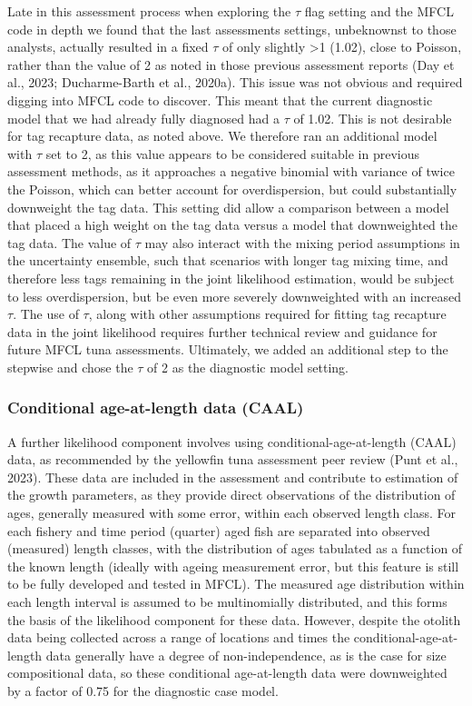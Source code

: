\documentclass[
  english,
  a4paper,
  a4paper,
  11pt]{SCreport}
\begin{document}
Late in this assessment process when exploring the \(\tau\) flag setting
and the MFCL code in depth we found that the last assessments settings,
unbeknownst to those analysts, actually resulted in a fixed \(\tau\) of
only slightly \textgreater1 (1.02), close to Poisson, rather than the
value of 2 as noted in those previous assessment reports (Day et al.,
2023; Ducharme-Barth et al., 2020a). This issue was not obvious and
required digging into MFCL code to discover. This meant that the current
diagnostic model that we had already fully diagnosed had a \(\tau\) of
1.02. This is not desirable for tag recapture data, as noted above. We
therefore ran an additional model with \(\tau\) set to 2, as this value
appears to be considered suitable in previous assessment methods, as it
approaches a negative binomial with variance of twice the Poisson, which
can better account for overdispersion, but could substantially
downweight the tag data. This setting did allow a comparison between a
model that placed a high weight on the tag data versus a model that
downweighted the tag data. The value of \(\tau\) may also interact with
the mixing period assumptions in the uncertainty ensemble, such that
scenarios with longer tag mixing time, and therefore less tags remaining
in the joint likelihood estimation, would be subject to less
overdispersion, but be even more severely downweighted with an increased
\(\tau\). The use of \(\tau\), along with other assumptions required for
fitting tag recapture data in the joint likelihood requires further
technical review and guidance for future MFCL tuna assessments.
Ultimately, we added an additional step to the stepwise and chose the
\(\tau\) of 2 as the diagnostic model setting.

\subsubsection{Conditional age-at-length data
(CAAL)}\label{sec-CAAL-likelihood}

A further likelihood component involves using conditional-age-at-length
(CAAL) data, as recommended by the yellowfin tuna assessment peer review
(Punt et al., 2023). These data are included in the assessment and
contribute to estimation of the growth parameters, as they provide
direct observations of the distribution of ages, generally measured with
some error, within each observed length class. For each fishery and time
period (quarter) aged fish are separated into observed (measured) length
classes, with the distribution of ages tabulated as a function of the
known length (ideally with ageing measurement error, but this feature is
still to be fully developed and tested in MFCL). The measured age
distribution within each length interval is assumed to be multinomially
distributed, and this forms the basis of the likelihood component for
these data. However, despite the otolith data being collected across a
range of locations and times the conditional-age-at-length data
generally have a degree of non-independence, as is the case for size
compositional data, so these conditional age-at-length data were
downweighted by a factor of 0.75 for the diagnostic case model.
\end{document}
